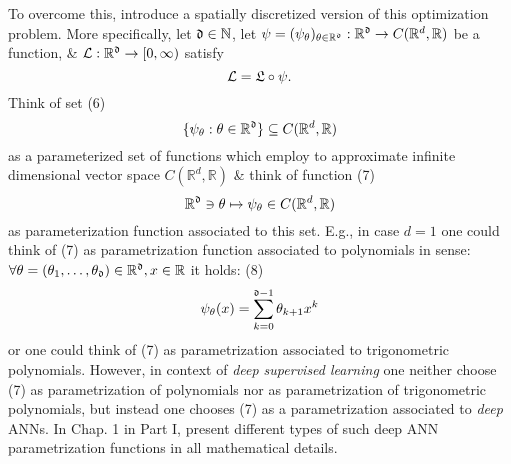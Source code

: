 \documentclass{article}
\begin{document}
\begin{enumerate}
	To overcome this, introduce a spatially discretized version of this optimization problem. More specifically, let ${\frak d}\in\mathbb{N}$, let $\psi = (\psi_\theta)_{\theta\in\mathbb{R}^{\frak d}}:\mathbb{R}^{\frak d}\to C(\mathbb{R}^d,\mathbb{R})$ be a function, \& ${\cal L}:\mathbb{R}^{\frak d}\to[0,\infty)$ satisfy
	\begin{equation}
		{\cal L} = {\frak L}\circ\psi.
	\end{equation}
	Think of set (6)
	\begin{equation}
		\{\psi_\theta:\theta\in\mathbb{R}^{\frak d}\}\subseteq C(\mathbb{R}^d,\mathbb{R})
	\end{equation}
	as a parameterized set of functions which employ to approximate infinite dimensional vector space $C(\mathbb{R}^d,\mathbb{R})$ \& think of function (7)
	\begin{equation}
		\mathbb{R}^{\frak d}\ni\theta\mapsto\psi_\theta\in C(\mathbb{R}^d,\mathbb{R})
	\end{equation}
	as parameterization function associated to this set. E.g., in case $d = 1$ one could think of (7) as parametrization function associated to polynomials in sense: $\forall\theta = (\theta_1,\ldots,\theta_{\frak d})\in\mathbb{R}^{\frak d},x\in\mathbb{R}$ it holds: (8)
	\begin{equation}
		\psi_\theta(x) = \sum_{k=0}^{{\frak d} - 1} \theta_{k+1}x^k
	\end{equation}
	or one could think of (7) as parametrization associated to trigonometric polynomials. However, in context of {\it deep supervised learning} one neither choose (7) as parametrization of polynomials nor as parametrization of trigonometric polynomials, but instead one chooses (7) as a parametrization associated to {\it deep} ANNs. In Chap. 1 in Part I, present different types of such deep ANN parametrization functions in all mathematical details.
	

\end{enumerate}
\end{document}

